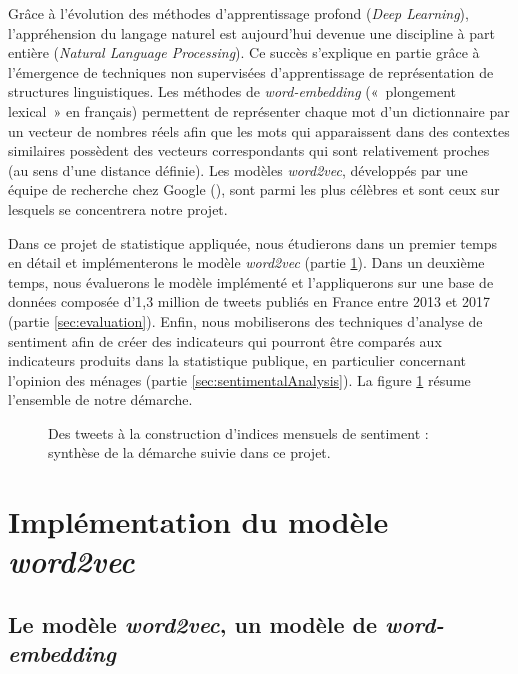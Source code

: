 \documentclass[11pt,french,french]{article}
\begin{document}
Grâce à l'évolution des méthodes d'apprentissage profond (\emph{Deep Learning}), l'appréhension du langage naturel est aujourd'hui devenue une discipline à part entière (\emph{Natural Language Processing}).
Ce succès s'explique en partie grâce à l'émergence de techniques non supervisées d'apprentissage de représentation de structures linguistiques.
Les méthodes de \emph{word-embedding} («~plongement lexical~» en français) permettent de représenter chaque mot d'un dictionnaire par un vecteur de nombres réels afin que les mots qui apparaissent dans des contextes similaires possèdent des vecteurs correspondants qui sont relativement proches (au sens d'une distance définie).
Les modèles \emph{word2vec}, développés par une équipe de recherche chez Google (\cite{Mikolov}), sont parmi les plus célèbres et sont ceux sur lesquels se concentrera notre projet.

Dans ce projet de statistique appliquée, nous étudierons dans un premier temps en détail et implémenterons le modèle \emph{word2vec} (partie \ref{sec:word2vec}).
Dans un deuxième temps, nous évaluerons le modèle implémenté et l'appliquerons sur une base de données composée d'1,3 million de tweets publiés en France entre 2013 et 2017 (partie \ref{sec:evaluation}).
Enfin, nous mobiliserons des techniques d'analyse de sentiment afin de créer des indicateurs qui pourront être comparés aux indicateurs produits dans la statistique publique, en particulier concernant l'opinion des ménages (partie \ref{sec:sentimentalAnalysis}). La figure \ref{fig:schemaRecap} résume l'ensemble de notre démarche.

\vfill

\begin{figure}[!htb]

\captionsetup{margin=0cm,format=hang,justification=justified}
\caption{Des tweets à la construction d'indices mensuels de sentiment : synthèse de la démarche suivie dans ce projet.}\label{fig:schemaRecap}
\end{figure}

\newpage

\hypertarget{sec:word2vec}{%
\section{\texorpdfstring{Implémentation du modèle \emph{word2vec}}{Implémentation du modèle word2vec}}\label{sec:word2vec}}

\hypertarget{le-moduxe8le-word2vec-un-moduxe8le-de-word-embedding}{%
\subsection{\texorpdfstring{Le modèle \emph{word2vec}, un modèle de \emph{word-embedding}}{Le modèle word2vec, un modèle de word-embedding}}\label{le-moduxe8le-word2vec-un-moduxe8le-de-word-embedding}}
\end{document}
